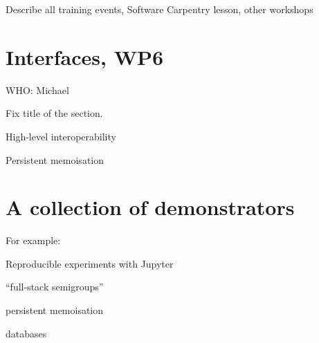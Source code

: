 \documentclass{deliverablereport}
\begin{document}
Describe all training events, Software Carpentry lesson, other workshops

\section{Interfaces, WP6}

WHO: Michael

Fix title of the section.

High-level interoperability

Persistent memoisation

\section{A collection of demonstrators}

For example:

Reproducible experiments with Jupyter

``full-stack semigroups''

persistent memoisation

databases
\end{document}
